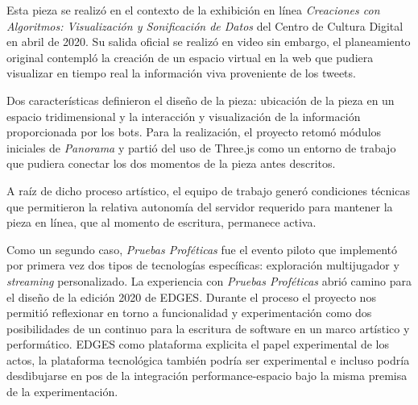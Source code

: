 
Esta pieza se realizó en el contexto de la exhibición en línea \textit{Creaciones con Algoritmos: Visualización y Sonificación de Datos} del Centro de Cultura Digital en abril de 2020. Su salida oficial se realizó en video sin embargo, el planeamiento original contempló la creación de un espacio virtual en la web que pudiera visualizar en tiempo real la información viva proveniente de los tweets.

Dos características definieron el diseño de la pieza: ubicación de la pieza en un espacio tridimensional y la interacción y visualización de la información proporcionada por los bots. Para la realización, el proyecto retomó módulos iniciales de \textit{Panorama} y partió del uso de Three.js como un entorno de trabajo que pudiera conectar los dos momentos de la pieza antes descritos. 

A raíz de dicho proceso artístico, el equipo de trabajo generó condiciones técnicas que permitieron la relativa autonomía del servidor requerido para mantener la pieza en línea, que al momento de escritura, permanece activa.






Como un segundo caso, \textit{Pruebas Proféticas} fue el evento piloto que implementó por primera vez dos tipos de tecnologías específicas: exploración multijugador y \textit{streaming} personalizado. La experiencia con \textit{Pruebas Proféticas} abrió camino para el diseño de la edición 2020 de EDGES. Durante el proceso el proyecto nos permitió reflexionar en torno a funcionalidad y experimentación como dos posibilidades de un continuo para la escritura de software en un marco artístico y performático. EDGES como plataforma explicita el papel experimental de los actos, la plataforma tecnológica también podría ser experimental e incluso podría desdibujarse en pos de la integración performance-espacio bajo la misma premisa de la experimentación.

